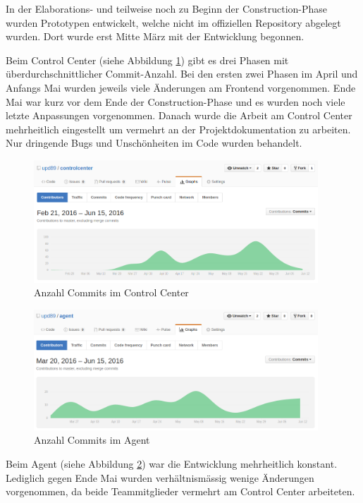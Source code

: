 In der Elaborations- und teilweise noch zu Beginn der Construction-Phase wurden Prototypen entwickelt, welche nicht im offiziellen Repository abgelegt wurden. Dort wurde erst Mitte März mit der Entwicklung begonnen. 

Beim Control Center (siehe Abbildung \ref{fig:commits-cc}) gibt es drei Phasen mit überdurchschnittlicher Commit-Anzahl. Bei den ersten zwei Phasen im April und Anfangs Mai wurden jeweils viele Änderungen am Frontend vorgenommen. Ende Mai war kurz vor dem Ende der Construction-Phase und es wurden noch viele letzte Anpassungen vorgenommen. Danach wurde die Arbeit am Control Center mehrheitlich eingestellt um vermehrt an der Projektdokumentation zu arbeiten. Nur dringende Bugs und Unschönheiten im Code wurden behandelt.

\begin{figure}
  \centering
    \includegraphics[width=0.95\textwidth]{fig/controlcenter_commits}
  \caption{Anzahl Commits im Control Center}
  \label{fig:commits-cc}
\end{figure}


\begin{figure}
  \centering
    \includegraphics[width=0.95\textwidth]{fig/agent_commits}
  \caption{Anzahl Commits im Agent}
  \label{fig:commits-a}
\end{figure}

Beim Agent (siehe Abbildung \ref{fig:commits-a}) war die Entwicklung mehrheitlich konstant. Lediglich gegen Ende Mai wurden verhältnismässig wenige Änderungen vorgenommen, da beide Teammitglieder vermehrt am Control Center arbeiteten.

